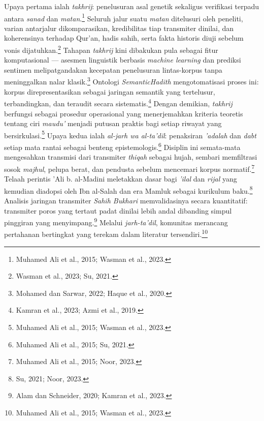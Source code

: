 Upaya pertama ialah \textit{takhrij}: penelusuran asal genetik sekaligus verifikasi terpadu antara \textit{sanad} dan \textit{matan}.\footnote{Muhamed Ali et al., 2015; Wasman et al., 2023.} Seluruh jalur suatu \textit{matan} ditelusuri oleh peneliti, varian antarjalur dikomparasikan, kredibilitas tiap transmiter dinilai, dan koherensinya terhadap Qur'an, hadis sahih, serta fakta historis diuji sebelum vonis dijatuhkan.\footnote{Wasman et al., 2023; Su, 2021.} Tahapan \textit{takhrij} kini dibakukan pula sebagai fitur komputasional --- asesmen linguistik berbasis \textit{machine learning} dan prediksi sentimen melipatgandakan kecepatan penelusuran lintas-korpus tanpa meninggalkan nalar klasik.\footnote{Mohamed dan Sarwar, 2022; Haque et al., 2020.} Ontologi \textit{SemanticHadith} mengotomatisasi proses ini: korpus direpresentasikan sebagai jaringan semantik yang tertelusur, terbandingkan, dan teraudit secara sistematis.\footnote{Kamran et al., 2023; Azmi et al., 2019.} Dengan demikian, \textit{takhrij} berfungsi sebagai prosedur operasional yang menerjemahkan kriteria teoretis tentang ciri \textit{maudu'} menjadi putusan praktis bagi setiap riwayat yang bersirkulasi.\footnote{Muhamed Ali et al., 2015; Wasman et al., 2023.} Upaya kedua ialah \textit{al-jarh wa al-ta'dil}: penaksiran \textit{'adalah} dan \textit{dabt} setiap mata rantai sebagai benteng epistemologis.\footnote{Muhamed Ali et al., 2015; Su, 2021.} Disiplin ini semata-mata mengesahkan transmisi dari transmiter \textit{thiqah} sebagai hujah, sembari memfiltrasi sosok \textit{majhul}, pelupa berat, dan pendusta sebelum mencemari korpus normatif.\footnote{Muhamed Ali et al., 2015; Noor, 2023.} Telaah perintis 'Ali b. al-Madini meletakkan dasar bagi \textit{'ilal} dan \textit{rijal} yang kemudian diadopsi oleh Ibn al-Salah dan era Mamluk sebagai kurikulum baku.\footnote{Su, 2021; Noor, 2023.} Analisis jaringan transmiter \textit{Sahih Bukhari} memvalidasinya secara kuantitatif: transmiter poros yang tertaut padat dinilai lebih andal dibanding simpul pinggiran yang menyimpang.\footnote{Alam dan Schneider, 2020; Kamran et al., 2023.} Melalui \textit{jarh-ta'dil}, komunitas merancang pertahanan bertingkat yang terekam dalam literatur tersendiri.\footnote{Muhamed Ali et al., 2015; Wasman et al., 2023.}

